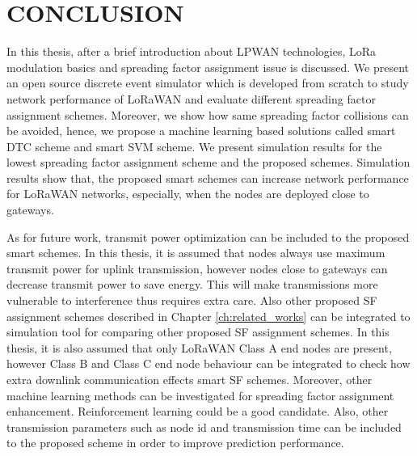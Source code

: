 \chapter{CONCLUSION}\label{ch:conclusion}

In this thesis, after a brief introduction about LPWAN technologies, LoRa modulation basics and spreading factor assignment issue is discussed. We present an open source discrete event simulator which is developed from scratch to study network performance of LoRaWAN and evaluate different spreading factor assignment schemes. Moreover, we show how same spreading factor collisions can be avoided, hence, we propose a machine learning based solutions called smart DTC scheme and smart SVM scheme. We present simulation results for the lowest spreading factor assignment scheme and the proposed schemes. Simulation results show that, the proposed smart schemes can increase network performance for LoRaWAN networks, especially, when the nodes are deployed close to gateways.


As for future work, transmit power optimization can be included to the proposed smart schemes. In this thesis, it is assumed that nodes always use maximum transmit power for uplink transmission, however nodes close to gateways can decrease transmit power to save energy. This will make transmissions more vulnerable to interference thus requires extra care. Also other proposed SF assignment schemes described in Chapter \ref{ch:related_works} can be integrated to simulation tool for comparing other proposed SF assignment schemes. In this thesis, it is also assumed that only LoRaWAN Class A end nodes are present, however Class B and Class C end node behaviour can be integrated to check how extra downlink communication effects smart SF schemes. Moreover, other machine learning methods can be investigated for spreading factor assignment enhancement. Reinforcement learning could be a good candidate. Also, other transmission parameters such as node id and transmission time can be included to the proposed scheme in order to improve prediction performance.
